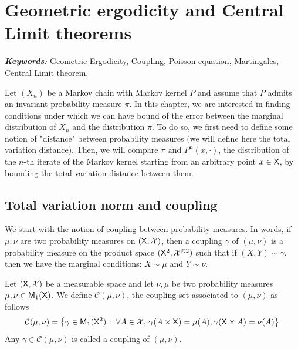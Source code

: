 \documentclass[english,graybox,envcountchap,envcountsame,sectrefs,shortlabels]{svmono}
\theoremstyle{style}
\renewenvironment{keywords}{\textit{\bf Keywords: } \sffamily }{}
\begin{document}
\begin{subappendices}
\end{subappendices}

\chapter{Geometric ergodicity and Central Limit theorems}

\minitoc
\begin{keywords}
Geometric Ergodicity, Coupling, Poisson equation, Martingales, Central Limit theorem.
\end{keywords}

\newcommand{\tvnorm}[1]{\left\|#1\right\|_{\mathrm{TV}}}
\newcommand{\coupling}{\mathcal{C}}

Let $(X_n)$ be a Markov chain with Markov kernel $P$ and assume that $P$ admits an invariant probability measure $\pi$. In this chapter, we are interested in finding conditions under which we can have bound of the error between the marginal distribution of $X_n$ and the distribution $\pi$. To do so, we first need to define some notion of "distance" between probability measures (we will define here the total variation distance). Then, we will compare $\pi$ and $P^n(x,\cdot)$, the distribution of the $n$-th iterate of the Markov kernel starting from an arbitrary point $x\in\mathsf{X}$, by bounding the total variation distance between them.


\section{Total variation norm and coupling}
We start with the notion of coupling between probability measures.
In words, if $\mu,\nu$ are two probability measures on $(\mathsf{X},\mathcal{X})$, then a coupling $\gamma$ of $(\mu,\nu)$ is a probability measure on the product space $(\mathsf{X}^2,\mathcal{X}^{\otimes 2})$ such that if $(X,Y) \sim \gamma$, then we have the marginal conditions: $X\sim\mu$ and $Y\sim \nu$.
\begin{shaded}
\begin{definition}
Let $(\mathsf{X},\mathcal{X})$ be a measurable space and let $\nu,\mu$ be two probability measures $\mu,\nu \in \mathsf{M}_{1}(\mathsf{X})$. We define $\coupling(\mu,\nu)$, the coupling set associated to $(\mu,\nu)$ as follows
$$
\coupling(\mu,\nu)=\set{\gamma\in\meas 1(\Xset^2)}{\forall A\in\Xsigma,\, \gamma(A\times\Xset)=\mu(A), \gamma(\Xset\times A)=\nu(A)}
$$
Any $\gamma\in\coupling(\mu,\nu)$ is called a coupling of $(\mu,\nu)$.
\end{definition}

\end{shaded}
\end{document}
